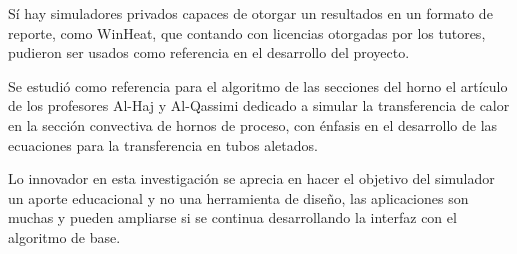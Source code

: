 \par Sí hay simuladores privados capaces de otorgar un resultados en un formato de reporte, como WinHeat\textsuperscript{\textcopyright}, que contando con licencias otorgadas por los tutores, pudieron ser usados como referencia en el desarrollo del proyecto.

\par Se estudió como referencia para el algoritmo de las secciones del horno el artículo de los profesores Al-Haj y Al-Qassimi\cite{sirios} dedicado a simular la transferencia de calor en la sección convectiva de hornos de proceso, con énfasis en el desarrollo de las ecuaciones para la transferencia en tubos aletados.

\par Lo innovador en esta investigación se aprecia en hacer el objetivo del simulador un aporte educacional y no una herramienta de diseño, las aplicaciones son muchas y pueden ampliarse si se continua desarrollando la interfaz con el algoritmo de base.